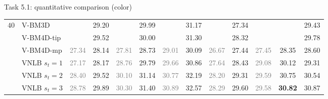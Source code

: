 \documentclass[mathserif, 8pt]{beamer}
\newcommand{\best}[1]{#1}
\newcommand{\bsic}[1]{\textcolor{gray}{#1}}
\newcommand{\Bsic}[1]{\textcolor{gray}{\textbf{#1}}}
\newcommand{\Best}[1]{\textbf{\textcolor{MyOrangeBrighter}{#1}}}
\begin{document}
\begin{frame}{Task 5.1: quantitative comparison (color)}
\begin{center}
{\begin{tabular}{ c | l |c c | c c | c c | c c | c c | c}
%                                                                                                                                                                                                                          
			\multirow{1}{*}{$40$}                                                                                                                                                                                           
			                      & V-BM3D               & \bsic{     } &       29.20  & \bsic{     } & \best{29.99} & \bsic{     } &       31.17  & \bsic{     } &       27.34  & \bsic{     } &              &       29.43  \\
			                      & V-BM4D-tip           & \bsic{     } & \best{29.52} & \bsic{     } & \best{30.00} & \bsic{     } & \best{31.30} & \bsic{     } &       28.32  & \bsic{     } &              &       29.78  \\
			                      & V-BM4D-mp            & \bsic{27.34} &       28.14  & \bsic{27.81} &       28.73  & \bsic{29.01} &       30.09  & \bsic{26.67} &       27.44  & \bsic{27.45} &       28.35  &       28.60  \\
			                      & VNLB   $s_t = 1$     & \bsic{27.17} &       28.17  & \bsic{28.76} &       29.79  & \bsic{29.66} &       30.86  & \bsic{27.64} &       28.43  & \bsic{29.08} &       30.12  &       29.31  \\
			                      & VNLB   $s_t = 2$     & \bsic{28.40} &       29.52  & \bsic{30.10} &       31.14  & \bsic{30.77} &       32.19  & \bsic{28.20} &       29.31  & \bsic{29.59} &       30.75  &       30.54  \\
			                      & VNLB   $s_t = 3$     & \bsic{28.78} &       29.89  & \bsic{30.30} &       31.40  & \bsic{30.89} &       32.57  & \bsic{28.29} &       29.60  & \bsic{29.58} & \Best{30.82} &       30.87  \\

\end{tabular}}
\end{center}
\end{frame}
\end{document}
